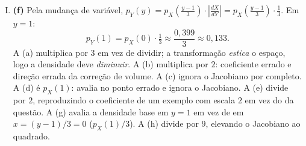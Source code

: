 \documentclass{dlproblemset}
\begin{document}
\begin{enumerate}[I)]
    \item \textbf{(f)} Pela mudança de variável, $p_Y(y) = p_X\!\left(\tfrac{y - 1}{3}\right) \cdot \left|\tfrac{dX}{dY}\right| = p_X\!\left(\tfrac{y - 1}{3}\right) \cdot \tfrac{1}{3}$. Em $y = 1$:
    \[
    p_Y(1) = p_X(0) \cdot \tfrac{1}{3} \approx \frac{0{,}399}{3} \approx 0{,}133.
    \]
    A (a) multiplica por $3$ em vez de dividir; a transformação \emph{estica} o espaço, logo a densidade deve \emph{diminuir}. A (b) multiplica por $2$: coeficiente errado e direção errada da correção de volume. A (c) ignora o Jacobiano por completo. A (d) é $p_X(1)$: avalia no ponto errado e ignora o Jacobiano. A (e) divide por $2$, reproduzindo o coeficiente de um exemplo com escala $2$ em vez do da questão. A (g) avalia a densidade base em $y = 1$ em vez de em $x = (y-1)/3 = 0$ ($p_X(1)/3$). A (h) divide por $9$, elevando o Jacobiano ao quadrado.
\end{enumerate}
\end{document}

